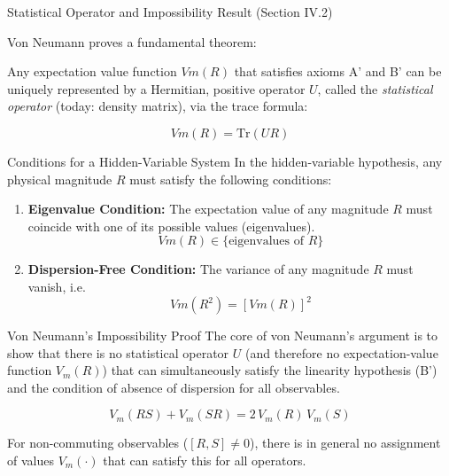 \begin{frame}{Statistical Operator and Impossibility Result (Section IV.2)}
 
  Von Neumann proves a fundamental theorem:  

  \pause
  Any expectation value function $Vm(R)$ that satisfies axioms A' and B' 
  can be uniquely represented by a Hermitian, positive operator $U$, 
  called the \textit{statistical operator} (today: density matrix), via the trace formula:

  \pause
  \[
    Vm(R) = \mathrm{Tr}(UR)
  \]
\end{frame}

\begin{frame}{Conditions for a Hidden-Variable System}
  In the hidden-variable hypothesis, any physical magnitude $R$ 
  must satisfy the following conditions:

  \pause
  \begin{enumerate}
    \item \textbf{Eigenvalue Condition:}  
    The expectation value of any magnitude $R$ must coincide with one of its possible values (eigenvalues).  
    \[
      Vm(R) \in \{\text{eigenvalues of } R\}
    \]

    \pause
    \item \textbf{Dispersion-Free Condition:}  
    The variance of any magnitude $R$ must vanish, i.e.  
    \[
      Vm(R^2) = [Vm(R)]^2
    \]
  \end{enumerate}
\end{frame}

\begin{frame}{Von Neumann's Impossibility Proof}
  The core of von Neumann's argument is to show that there is no statistical operator $U$ 
  (and therefore no expectation-value function $V_m(R)$) that can simultaneously satisfy 
  the linearity hypothesis (B') and the condition of absence of dispersion for all observables.

  \vspace{0.5cm}

  \[
    V_m(RS) + V_m(SR) = 2\,V_m(R)\,V_m(S)
  \]

  \vspace{0.5cm}

  For non-commuting observables ($[R,S]\neq 0$), there is in general no assignment 
  of values $V_m(\cdot)$ that can satisfy this for all operators.
\end{frame}



